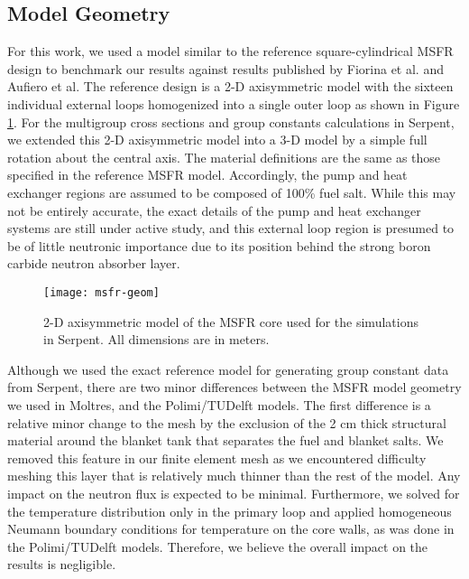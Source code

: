 \subsection{Model Geometry}

For this work, we used a model similar to the reference square-cylindrical
\gls{MSFR} design to benchmark our results against results published by
Fiorina et al. and Aufiero et al. The reference design is a 2-D axisymmetric
model with the sixteen individual external loops homogenized into a single
outer loop as shown in Figure \ref{fig:msfrgeom}. For the multigroup
cross sections and group constants calculations in Serpent, we extended this
2-D axisymmetric model into a 3-D model by a simple full rotation about the
central axis. The material definitions are the same as those specified in the
reference \gls{MSFR} model. Accordingly, the pump and heat exchanger regions
are assumed to be composed of 100\% fuel salt. While this may not be entirely
accurate, the exact details of the pump and heat exchanger systems are still
under active study, and this external loop region is presumed to be of little
neutronic importance due to its position behind the strong boron carbide
neutron absorber layer.
%
\begin{figure}[t!] 
	\centering
	\texttt{[image: msfr-geom]}
	\caption{2-D axisymmetric model of the \gls{MSFR} core used for the
	simulations in Serpent. All dimensions are in meters.
	\cite{brovchenko_neutronic_2019}}
	\label{fig:msfrgeom}
\end{figure}

Although we used the exact reference model for generating group constant data
from Serpent, there are two minor differences between the \gls{MSFR} model
geometry we used in Moltres, and the Polimi/TUDelft models. The
first difference is a relative
minor change to the mesh by the exclusion of the 2 cm thick structural
material around the blanket tank that separates the fuel and blanket salts.
We removed this feature in our finite element mesh as we encountered
difficulty meshing this layer that is relatively much thinner than the rest of
the model. Any impact on the
neutron flux is expected to be minimal. Furthermore, we solved for the
temperature distribution only in the primary loop and applied homogeneous
Neumann boundary conditions for temperature on the core walls, as was done in
the Polimi/TUDelft models. Therefore, we believe the overall impact on the
results is negligible.

